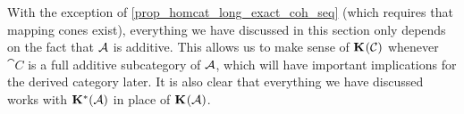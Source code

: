 \begin{remark}
  \label{rem_homcat_of_additive_cat}
  With the exception of \cref{prop_homcat_long_exact_coh_seq} (which
  requires that mapping cones exist), everything we have discussed in
  this section only depends on the fact that $\abcat{A}$ is additive.
  This allows us to make sense of $\homcat{\abcat{C}}$ whenever
  $\cat{C}$ is a full additive subcategory of $\abcat{A}$, which will
  have important implications for the derived category later.
  It is also clear that everything we have discussed works with
  $\homcat[*]{\abcat{A}}$ in place of $\homcat{\abcat{A}}$.
\end{remark}
